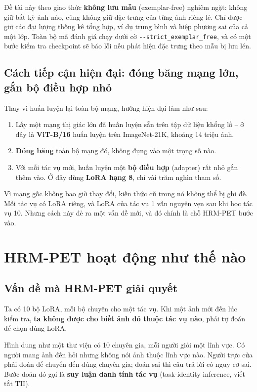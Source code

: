 \documentclass[11pt,a4paper]{article}
\begin{document}
Đề tài này theo giao thức \textbf{không lưu mẫu} (exemplar-free) nghiêm ngặt:
không giữ bất kỳ ảnh nào, cũng không giữ đặc trưng của từng ảnh riêng lẻ. Chỉ
được giữ các đại lượng thống kê tổng hợp, ví dụ trung bình và hiệp phương sai của
cả một lớp. Toàn bộ mã đánh giá chạy dưới cờ
\texttt{-{}-strict\_exemplar\_free}, và có một bước kiểm tra checkpoint sẽ báo
lỗi nếu phát hiện đặc trưng theo mẫu bị lưu lén.

\subsection{Cách tiếp cận hiện đại: đóng băng mạng lớn, gắn bộ điều hợp nhỏ}

Thay vì huấn luyện lại toàn bộ mạng, hướng hiện đại làm như sau:

\begin{enumerate}
\item Lấy một mạng thị giác lớn đã huấn luyện sẵn trên tập dữ liệu khổng lồ --
      ở đây là \textbf{ViT-B/16} huấn luyện trên ImageNet-21K, khoảng 14 triệu ảnh.
\item \textbf{Đóng băng} toàn bộ mạng đó, không đụng vào một trọng số nào.
\item Với mỗi tác vụ mới, huấn luyện một \textbf{bộ điều hợp} (adapter) rất nhỏ
      gắn thêm vào. Ở đây dùng \textbf{LoRA hạng 8}, chỉ vài trăm nghìn tham số.
\end{enumerate}

Vì mạng gốc không bao giờ thay đổi, kiến thức cũ trong nó không thể bị ghi đè.
Mỗi tác vụ có LoRA riêng, và LoRA của tác vụ 1 vẫn nguyên vẹn sau khi học tác vụ
10. Nhưng cách này đẻ ra một vấn đề mới, và đó chính là chỗ HRM-PET bước vào.

\section{HRM-PET hoạt động như thế nào}

\subsection{Vấn đề mà HRM-PET giải quyết}

Ta có 10 bộ LoRA, mỗi bộ chuyên cho một tác vụ. Khi một ảnh mới đến lúc kiểm tra,
\textbf{ta không được cho biết ảnh đó thuộc tác vụ nào}, phải tự đoán để chọn
đúng LoRA.

Hình dung như một thư viện có 10 chuyên gia, mỗi người giỏi một lĩnh vực. Có
người mang ảnh đến hỏi nhưng không nói ảnh thuộc lĩnh vực nào. Người trực cửa
phải đoán để chuyển đến đúng chuyên gia; đoán sai thì câu trả lời có nguy cơ sai.
Bước đoán đó gọi là \textbf{suy luận danh tính tác vụ} (task-identity inference,
viết tắt TII).
\end{document}
